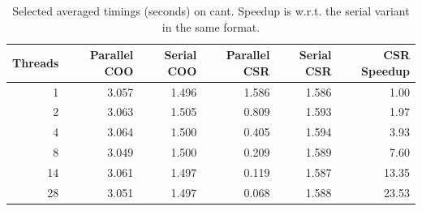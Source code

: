 \documentclass[11pt]{article}
\begin{document}
\begin{table}[ht]
  \centering
  \caption{Selected averaged timings (seconds) on cant. Speedup is w.r.t. the serial variant in the same format.}
  \label{tab:summary}
  \begin{tabular}{rrrrrr}
    \toprule
    Threads & Parallel COO & Serial COO & Parallel CSR & Serial CSR & CSR Speedup \\
    \midrule
     1 & 3.057 & 1.496 & 1.586 & 1.586 & 1.00 \\
     2 & 3.063 & 1.505 & 0.809 & 1.593 & 1.97 \\
     4 & 3.064 & 1.500 & 0.405 & 1.594 & 3.93 \\
     8 & 3.049 & 1.500 & 0.209 & 1.589 & 7.60 \\
    14 & 3.061 & 1.497 & 0.119 & 1.587 & 13.35 \\
    28 & 3.051 & 1.497 & 0.068 & 1.588 & 23.53 \\
    \bottomrule
  \end{tabular}
\end{table}
\end{document}
